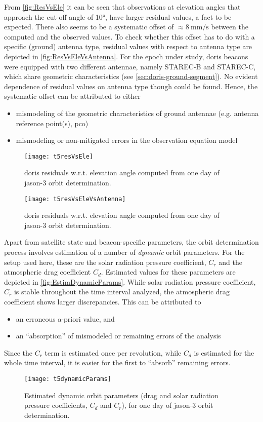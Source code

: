 From \autoref{fig:ResVsEle} it can be seen that observations at elevation angles that 
approach the cut-off angle of \ang{10}, have larger residual values, a fact to be expected. 
There also seems to be a systematic offset of $\approx \SI{8}{\milli\meter\per\second}$ 
between the computed and the observed values. To check whether this offset has to do 
with a specific (ground) antenna type, residual values with respect to antenna type 
are depicted in \autoref{fig:ResVsEleVsAntenna}. For the epoch under study, \gls{doris} 
beacons were equipped with two different antennae, namely STAREC-B and STAREC-C, which 
share geometric characteristics (see \autoref{sec:doris-ground-segment}). No evident 
dependence of residual values on antenna type though could be found. Hence, the 
systematic offset can be attributed to either
\begin{itemize}
  \item mismodeling of the geometric characteristics of ground antennae (e.g. antenna reference point(s), \gls{pco})
  \item mismodeling or non-mitigated errors in the observation equation model
\end{itemize}
\begin{figure}
    \centering
    \texttt{[image: t5resVsEle]}
    \caption{\gls{doris} residuals w.r.t. elevation angle computed from one day of \gls{jason}-3 orbit determination.}
    \label{fig:ResVsEle}
\end{figure}

\begin{figure}
    \centering
    \texttt{[image: t5resVsEleVsAntenna]}
    \caption{\gls{doris} residuals w.r.t. elevation angle computed from one day of \gls{jason}-3 orbit determination.}
    \label{fig:ResVsEleVsAntenna}
\end{figure}

Apart from satellite state and beacon-specific parameters, the orbit determination process 
involves estimation of a number of \emph{dynamic} orbit parameters. For the setup used here, 
these are the solar radiation pressure coefficient, $C_r$ and the atmospheric drag 
coefficient $C_d$. Estimated values for these parameters are depicted in 
\autoref{fig:EstimDynamicParams}. While solar radiation pressure coefficient, $C_r$ 
is stable throughout the time interval analyzed, the atmospheric drag coefficient 
shows larger discrepancies. This can be attributed to
\begin{itemize}
  \item an erroneous a-priori value, and
  \item an ``absorption'' of mismodeled or remaining errors of the analysis
\end{itemize}
Since the $C_r$ term is estimated once per revolution, while $C_d$ is estimated for the 
whole time interval, it is easier for the first to ``absorb'' remaining errors.
\begin{figure}
    \centering
    \texttt{[image: t5dynamicParams]}
    \caption{Estimated dynamic orbit parameters (drag and solar radiation pressure coefficients, $C_d$ and $C_r$), for one day of \gls{jason}-3 orbit determination.}
    \label{fig:EstimDynamicParams}
\end{figure}

